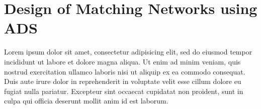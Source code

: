 \documentclass[report.tex]{subfiles}
\begin{document}
\section{Design of Matching Networks using ADS}
Lorem ipsum dolor sit amet, consectetur adipisicing elit, sed do eiusmod tempor incididunt ut labore et dolore magna aliqua. Ut enim ad minim veniam, quis nostrud exercitation ullamco laboris nisi ut aliquip ex ea commodo consequat. Duis aute irure dolor in reprehenderit in voluptate velit esse cillum dolore eu fugiat nulla pariatur. Excepteur sint occaecat cupidatat non proident, sunt in culpa qui officia deserunt mollit anim id est laborum.








\end{document}

